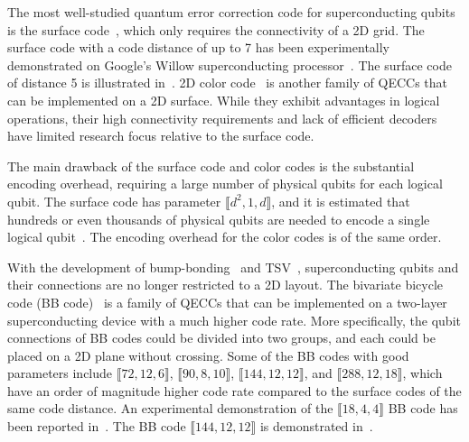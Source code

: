 \documentclass[a4paper,onecolumn,11pt,unpublished]{quantumarticle}
\begin{document}
The most well-studied quantum error correction code for superconducting qubits is the surface code~\cite{bravyi1998quantum,freedman2001projective}, which only requires the connectivity of a 2D grid. The surface code with a code distance of up to 7 has been experimentally demonstrated on Google's Willow superconducting processor~\cite{Acharya2024Quantum}. The surface code of distance 5 is illustrated in~. 2D color code~\cite{bombin2006topological} is another family of QECCs that can be implemented on a 2D surface. While they exhibit advantages in logical operations, their high connectivity requirements and lack of efficient decoders have limited research focus relative to the surface code.

The main drawback of the surface code and color codes is the substantial encoding overhead,  requiring a large number of physical qubits for each logical qubit. The surface code has parameter $\llbracket d^2, 1, d \rrbracket$, and it is estimated that hundreds or even thousands of physical qubits are needed to encode a single logical qubit~\cite{fowler2012surface}. The encoding overhead for the color codes is of the same order.

With the development of bump-bonding~\cite{rosenberg20173d,field2024modular,kosen2024signal,norris2025performancecharacterizationmultimodulequantum} and TSV~\cite{yost2020solid,mallek2021fabricationsuperconductingthroughsiliconvias,hazard2023characterization}, superconducting qubits and their connections are no longer restricted to a 2D layout. The bivariate bicycle code (BB code)~\cite{bravyi_high-threshold_2024} is a family of QECCs that can be implemented on a two-layer superconducting device with a much higher code rate. More specifically, the qubit connections of BB codes could be divided into two groups, and each could be placed on a 2D plane without crossing. Some of the BB codes with good parameters include $\llbracket 72, 12, 6 \rrbracket$, $\llbracket 90, 8, 10 \rrbracket$, $\llbracket 144, 12, 12 \rrbracket$, and $\llbracket 288, 12, 18 \rrbracket$, which have an order of magnitude higher code rate compared to the surface codes of the same code distance. An experimental demonstration of the $\llbracket 18, 4, 4 \rrbracket$ BB code has been reported in~\cite{wang2025demonstrationlowoverheadquantumerror}. The BB code $\llbracket 144, 12, 12 \rrbracket$ is demonstrated in~.
\end{document}
